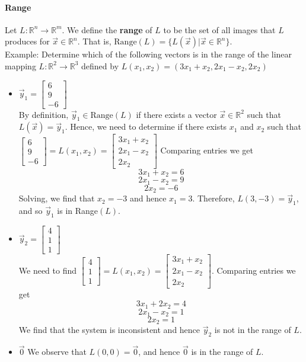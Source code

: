 \documentclass[10pt,letter]{article}
\begin{document}
\paragraph{Range} Let $L:\mathbb{R}^n\rightarrow\mathbb{R}^m$. We define the \textbf{range} of $L$ to be the set of all images that $L$ produces for $\vec{x}\in\mathbb{R}^n$. That is, $\text{Range}(L)=\{L(\vec{x})|\vec{x}\in\mathbb{R}^n\}$. \\ 
Example: Determine which of the following vectors is in the range of the linear mapping $L:\mathbb{R}^2\rightarrow\mathbb{R}^3$ defined by $L(x_1,x_2)=(3x_1+x_2,2x_1-x_2,2x_2)$ \begin{itemize}
    \item $\vec{y}_1=\begin{bmatrix}6\\9\\-6\end{bmatrix}$\\ By definition, $\vec{y}_1\in\text{Range}(L)$ if there exists a vector $\vec{x}\in\mathbb{R}^2$ such that $L(\vec{x})=\vec{y}_1$. Hence, we need to determine if there exists $x_1$ and $x_2$ such that $\begin{bmatrix}6\\9\\-6\end{bmatrix}=L(x_1,x_2)=\begin{bmatrix}3x_1+x_2\\2x_1-x_2\\2x_2\end{bmatrix}$ Comparing entries we get $$3x_1+x_2=6$$ $$2x_1-x_2=9$$ $$2x_2=-6$$ Solving, we find that $x_2=-3$ and hence $x_1=3$. Therefore, $L(3,-3)=\vec{y}_1$, and so $\vec{y}_1$ is in Range$(L)$. 
    \item $\vec{y}_2=\begin{bmatrix}4\\1\\1\end{bmatrix}$ \\ We need to find $\begin{bmatrix}4\\1\\1\end{bmatrix}=L(x_1,x_2)=\begin{bmatrix}3x_1+x_2\\2x_1-x_2\\2x_2\end{bmatrix}$. Comparing entries we get $$3x_1+2x_2=4$$ $$2x_1-x_2=1$$ $$2x_2=1$$ We find that the system is inconsistent and hence $\vec{y}_2$ is not in the range of $L$.  
    \item $\vec{0}$ We observe that $L(0,0)=\vec{0}$, and hence $\vec{0}$ is in the range of $L$. 
\end{itemize}
\end{document}
